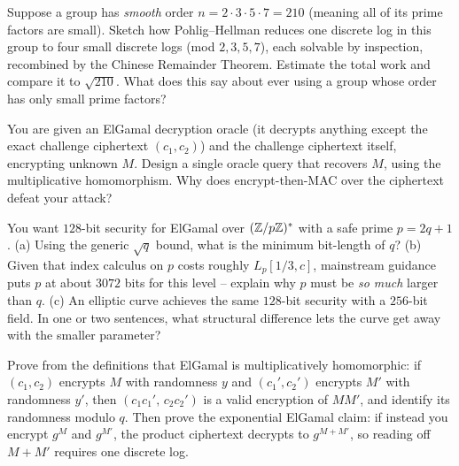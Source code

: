 \begin{exercise}
\label{ch20:exc-pohlig}
Suppose a group has \emph{smooth} order $n = 2 \cdot 3 \cdot 5 \cdot 7 = 210$ (meaning all of its prime factors are small). Sketch how
Pohlig--Hellman reduces one discrete log in this group to four small discrete logs (mod $2,3,5,7$),
each solvable by inspection, recombined by the Chinese Remainder Theorem. Estimate the total work and
compare it to $\sqrt{210}$. What does this say about ever using a group whose order has only small
prime factors?
\end{exercise}

\begin{exercise}
\label{ch20:exc-cca}
You are given an ElGamal decryption oracle (it decrypts anything except the exact challenge
ciphertext $(c_1, c_2)$) and the challenge ciphertext itself, encrypting unknown $M$. Design a single
oracle query that recovers $M$, using the multiplicative homomorphism. Why does encrypt-then-MAC over
the ciphertext defeat your attack?
\end{exercise}

\begin{exercise}
\label{ch20:exc-sizing}
You want $128$-bit security for ElGamal over $(\mathbb{Z}/p\mathbb{Z})^{*}$ with a safe prime $p = 2q + 1$. (a) Using the
generic $\sqrt{q}$ bound, what is the minimum bit-length of $q$? (b) Given that index calculus on $p$
costs roughly $L_p[1/3, c]$, mainstream guidance puts $p$ at about $3072$ bits for this level -- explain
why $p$ must be \emph{so much} larger than $q$. (c) An elliptic curve achieves the same $128$-bit
security with a $256$-bit field. In one or two sentences, what structural difference lets the curve
get away with the smaller parameter?
\end{exercise}

\begin{exercise}
\label{ch20:exc-prove-homo}
Prove from the definitions that ElGamal is multiplicatively homomorphic: if $(c_1, c_2)$ encrypts $M$
with randomness $y$ and $(c_1', c_2')$ encrypts $M'$ with randomness $y'$, then
$(c_1 c_1',\, c_2 c_2')$ is a valid encryption of $M M'$, and identify its randomness modulo $q$. Then prove the
exponential ElGamal claim: if instead you encrypt $g^{M}$ and $g^{M'}$, the product ciphertext
decrypts to $g^{M + M'}$, so reading off $M + M'$ requires one discrete log.
\end{exercise}
